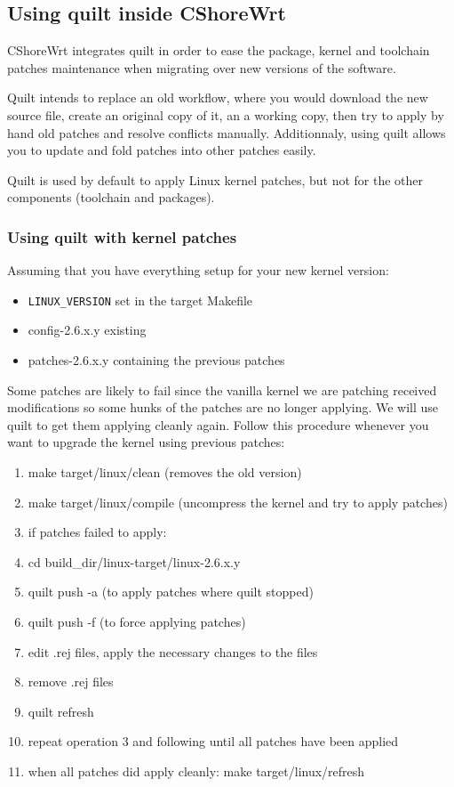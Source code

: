 \subsection{Using quilt inside CShoreWrt}

CShoreWrt integrates quilt in order to ease the package, kernel and toolchain
patches maintenance when migrating over new versions of the software.

Quilt intends to replace an old workflow, where you would download the new
source file, create an original copy of it, an a working copy, then try to
apply by hand old patches and resolve conflicts manually. Additionnaly, using
quilt allows you to update and fold patches into other patches easily.

Quilt is used by default to apply Linux kernel patches, but not for the other
components (toolchain and packages).

\subsubsection{Using quilt with kernel patches}

Assuming that you have everything setup for your new kernel version:
\begin{itemize}
\item \texttt{LINUX\_VERSION} set in the target Makefile
\item config-2.6.x.y existing
\item patches-2.6.x.y containing the previous patches
\end{itemize}

Some patches are likely to fail since the vanilla kernel we are patching
received modifications so some hunks of the patches are no longer applying.
We will use quilt to get them applying cleanly again. Follow this procedure
whenever you want to upgrade the kernel using previous patches:

\begin{enumerate}
\item make target/linux/clean (removes the old version)
\item make target/linux/compile (uncompress the kernel and try to apply patches)
\item if patches failed to apply:
\item cd build\_dir/linux-target/linux-2.6.x.y
\item quilt push -a (to apply patches where quilt stopped)
\item quilt push -f (to force applying patches)
\item edit .rej files, apply the necessary changes to the files
\item remove .rej files
\item quilt refresh
\item repeat operation 3 and following until all patches have been applied
\item when all patches did apply cleanly: make target/linux/refresh
\end{enumerate}

